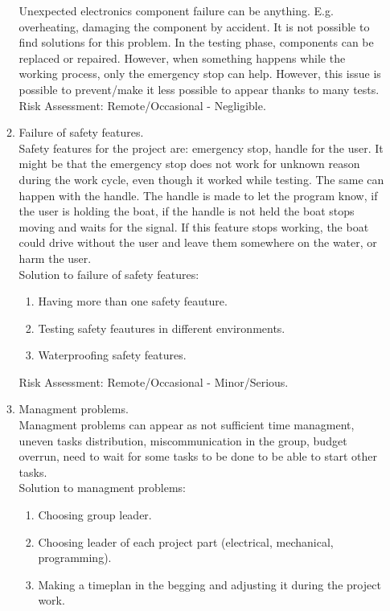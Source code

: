 \documentclass{article}[10pt]
\begin{document}
\begin{enumerate}
\begin{enumerate}
        Unexpected electronics component failure can be anything. E.g. overheating, damaging the component by accident. It is not possible 
        to find solutions for this problem. In the testing phase, components can be replaced or repaired. However, when something happens while 
        the working process, only the emergency stop can help. However, this issue is possible to prevent/make it less possible to appear 
        thanks to many tests. 
        Risk Assessment: Remote/Occasional - Negligible.
        \item Failure of safety features.\\
        Safety features for the project are: emergency stop, handle for the user. It might be that the emergency stop does not work for 
        unknown reason during the work cycle, even though it worked while testing. The same can happen with the handle. The handle is made to
        let the program know, if the user is holding the boat, if the handle is not held the boat stops moving and waits for the signal. If 
        this feature stops working, the boat could drive without the user and leave them somewhere on the water, or harm the user.\\
        Solution to failure of safety features:
        \begin{enumerate}
            \item Having more than one safety feauture.
            \item Testing safety feautures in different environments.
            \item Waterproofing safety features.
        \end{enumerate}
        Risk Assessment: Remote/Occasional - Minor/Serious.
        \item Managment problems. \\
        Managment problems can appear as not sufficient time managment, uneven tasks distribution, miscommunication in the group, budget overrun, 
        need to wait for some tasks to be done to be able to start other tasks.\\
        Solution to managment problems:
        \begin{enumerate}
            \item Choosing group leader.
            \item Choosing leader of each project part (electrical, mechanical, programming).
            \item Making a timeplan in the begging and adjusting it during the project work.

\end{enumerate}
\end{enumerate}
\end{enumerate}
\end{document}
